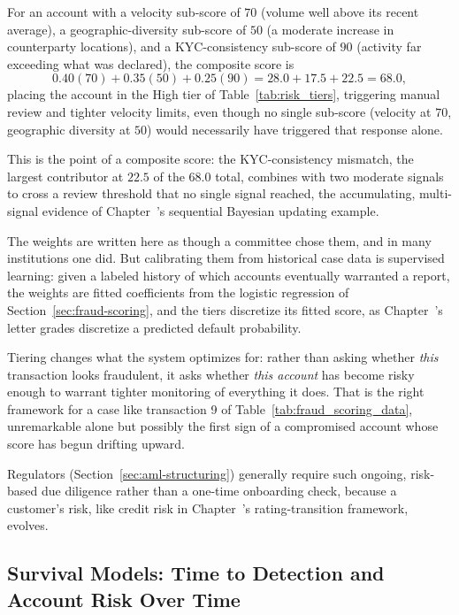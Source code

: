 \documentclass[../ai_in_finance]{subfiles}
\begin{document}
For an account with a velocity sub-score of $70$ (volume well above its recent average), a geographic-diversity sub-score of $50$ (a moderate increase in counterparty locations), and a KYC-consistency sub-score of $90$ (activity far exceeding what was declared), the composite score is
\begin{equation*}
0.40(70) + 0.35(50) + 0.25(90) = 28.0 + 17.5 + 22.5 = 68.0,
\end{equation*}
placing the account in the High tier of Table~\ref{tab:risk_tiers}, triggering manual review and tighter velocity limits, even though no single sub-score (velocity at $70$, geographic diversity at $50$) would necessarily have triggered that response alone.

This is the point of a composite score: the KYC-consistency mismatch, the largest contributor at $22.5$ of the $68.0$ total, combines with two moderate signals to cross a review threshold that no single signal reached, the accumulating, multi-signal evidence of Chapter~'s sequential Bayesian updating example.

The weights are written here as though a committee chose them, and in many institutions one did. But calibrating them from historical case data is supervised learning: given a labeled history of which accounts eventually warranted a report, the weights are fitted coefficients from the logistic regression of Section~\ref{sec:fraud-scoring}, and the tiers discretize its fitted score, as Chapter~'s letter grades discretize a predicted default probability.

Tiering changes what the system optimizes for: rather than asking whether \emph{this} transaction looks fraudulent, it asks whether \emph{this account} has become risky enough to warrant tighter monitoring of everything it does. That is the right framework for a case like transaction 9 of Table~\ref{tab:fraud_scoring_data}, unremarkable alone but possibly the first sign of a compromised account whose score has begun drifting upward.

Regulators (Section~\ref{sec:aml-structuring}) generally require such ongoing, risk-based due diligence rather than a one-time onboarding check, because a customer's risk, like credit risk in Chapter~'s rating-transition framework, evolves.

\subsection{Survival Models: Time to Detection and Account Risk Over Time}
\label{sec:survival-fraud}
\end{document}
